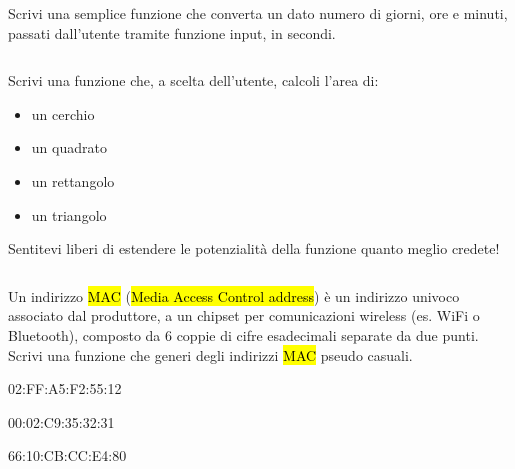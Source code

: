 \documentclass[a4paper,11pt,addpoints]{exam}
\begin{document}
\begin{questions}
    \begin{solution}
        \small\inputminted{python}{solution/012.py}
    \end{solution}

    \questionspace

    \question[5]  Scrivi una semplice funzione che converta un dato numero di giorni, ore e minuti,
    passati dall'utente tramite funzione input, in secondi.

    \begin{solution}
        \small\inputminted{python}{solution/013.py}
    \end{solution}

    \questionspace

    \question[12]  Scrivi una funzione che, a scelta dell'utente, calcoli l'area di:
    \begin{itemize}
        \item un cerchio
        \item un quadrato
        \item un rettangolo
        \item un triangolo
    \end{itemize}

    \begin{tips}
        \item Sentitevi liberi di estendere le potenzialità della funzione quanto meglio credete!
    \end{tips}

    \begin{solution}
        \small\inputminted{python}{solution/014.py}
    \end{solution}

    \questionspace

    \question[4]  Un indirizzo \hl{MAC} (\hl{Media Access Control address}) è un indirizzo univoco
    associato dal produttore, a un chipset per comunicazioni wireless (es. WiFi o Bluetooth),
    composto da 6 coppie di cifre esadecimali separate da due punti.  Scrivi una funzione  che
    generi degli indirizzi \hl{MAC} pseudo casuali.

    \begin{examples}
        \item 02:FF:A5:F2:55:12
        \item 00:02:C9:35:32:31
        \item 66:10:CB:CC:E4:80
    \end{examples}


\end{questions}
\end{document}

